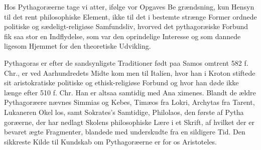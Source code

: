 \documentclass[12pt,a4paper]{book}
\begin{document}
Hos Pythagoræerne tage vi atter, ifølge vor Opgaves Be\-%
grændsning, kun Hensyn til det rent philosophiske Element,
ikke til det i bestemte strænge Former ordnede politiske og
sædeligt-religiøse Samfundsliv, hvorved det pythagoræiske
Forbund fik saa stor en Indflydelse, som var den oprindelige
Interesse og som dannede ligesom Hjemmet for den theoretiske
Udvikling.

Pythagoras er efter de sandsynligste Traditioner født paa
Samos omtrent 582 f. Chr., er ved Aarhundredets Midte kom\-%
men til Italien, hvor han i Kroton stiftede sit aristokratiske
politiske og ethisk-religiøse Forbund og hvor han døde ikke
længe efter 510 f. Chr. Han er altsaa samtidig med Ana\-%
ximenes. Blandt de ældre Pythagoræere nævnes Simmias og
Kebes, Timæos fra Lokri, Archytas fra Tarent, Lukaneren Okel\-%
los, samt Sokrates's Samtidige, Philolaos, den første af Pytha\-%
goræerne, der har nedlagt Skolens philosophiske Lære i et
Skrift, af hvilket der er bevaret ægte Fragmenter, blandede
med underskudte fra en sildigere Tid. Den sikkreste Kilde
til Kundskab om Pythagoræerne er for os Aristoteles.
\end{document}
